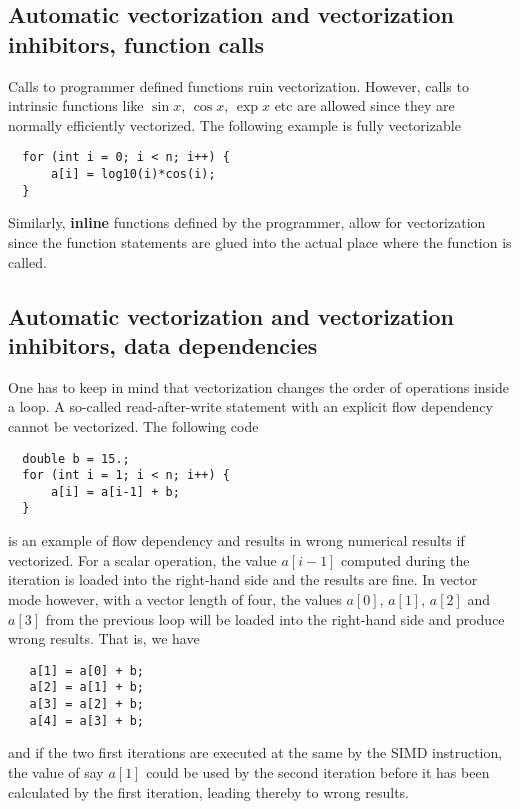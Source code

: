 \documentclass[%
oneside,                 %
final,                   %
10pt]{article}
\begin{document}
\subsection*{Automatic vectorization and vectorization inhibitors, function calls}

Calls to programmer defined functions ruin vectorization. However, calls to intrinsic functions like
$\sin{x}$, $\cos{x}$, $\exp{x}$ etc are allowed since they are normally efficiently vectorized. 
The following example is fully vectorizable
\begin{verbatim}
  for (int i = 0; i < n; i++) {
      a[i] = log10(i)*cos(i);
  }
\end{verbatim}
Similarly, \textbf{inline} functions defined by the programmer, allow for vectorization since the function statements are glued into the actual place where the function is called. 


\subsection*{Automatic vectorization and vectorization inhibitors, data dependencies}

One has to keep in mind that vectorization changes the order of operations inside a loop. A so-called
read-after-write statement with an explicit flow dependency cannot be vectorized. The following code
\begin{verbatim}
  double b = 15.;
  for (int i = 1; i < n; i++) {
      a[i] = a[i-1] + b;
  }
\end{verbatim}
is an example of flow dependency and results in wrong numerical results if vectorized. For a scalar operation, the value $a[i-1]$ computed during the iteration is loaded into the right-hand side and the results are fine. In vector mode however, with a vector length of four, the values $a[0]$, $a[1]$, $a[2]$ and $a[3]$ from the previous loop will be loaded into the right-hand side and produce wrong results. That is, we have
\begin{verbatim}
   a[1] = a[0] + b;
   a[2] = a[1] + b;
   a[3] = a[2] + b;
   a[4] = a[3] + b;
\end{verbatim}
and if the two first iterations are  executed at the same by the SIMD instruction, the value of say $a[1]$ could be used by the second iteration before it has been calculated by the first iteration, leading thereby to wrong results.
\end{document}
